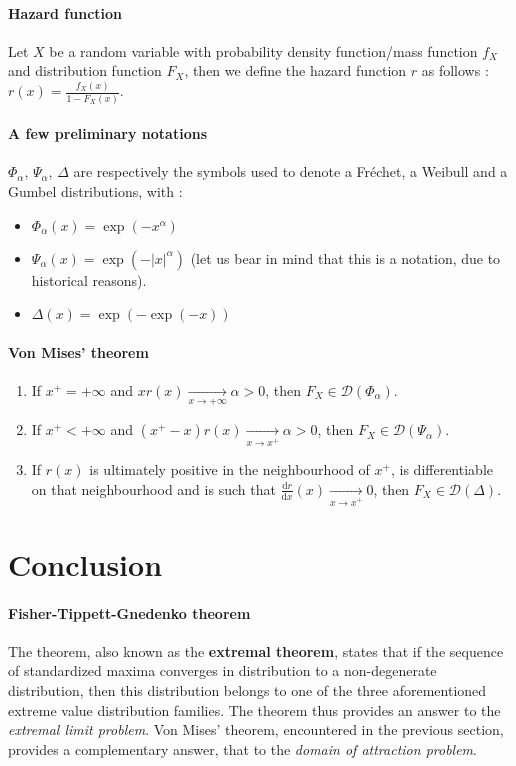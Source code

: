 \paragraph{Hazard function} Let $X$ be a random variable with probability density function/mass function $f_X$ and distribution function $F_X$, then we define the hazard function $r$ as follows : \newline
$r(x) = \frac{f_X(x)}{1 - F_X(x)}$.
\paragraph{A few preliminary notations} $\Phi_\alpha$, $\Psi_\alpha$, $\Delta$ are respectively the symbols used to denote a Fréchet, a Weibull and a Gumbel distributions, with :
\begin{itemize}
	\item $\Phi_\alpha(x) = \exp(- x^\alpha)$
	\item $\Psi_\alpha(x) = \exp(-  \lvert x \rvert^\alpha)$ (let us bear in mind that this is a notation, due to historical reasons).
	\item $\Delta(x) = \exp(- \exp(- x))$
\end{itemize}
\paragraph{Von Mises' theorem}
\begin{enumerate}
	\item If $x^+ = + \infty$ and $x r(x) \xrightarrow[x \rightarrow + \infty]{} \alpha > 0$, then $F_X \in \mathcal{D}(\Phi_\alpha)$.
	\item If $x^+ < + \infty$ and $(x^+ - x) r(x) \xrightarrow[x \rightarrow x^+]{} \alpha > 0$, then $F_X \in \mathcal{D}(\Psi_\alpha)$.
	\item If $r(x)$ is ultimately positive in the neighbourhood of $x^+$, is differentiable on that neighbourhood and is such that $\frac{\mathrm{d}r}{\mathrm{d}x}(x) \xrightarrow[x \rightarrow x^+]{} 0$, then $F_X \in \mathcal{D}(\Delta)$.
\end{enumerate}
\section{Conclusion}
\paragraph{Fisher-Tippett-Gnedenko theorem} The  theorem, also known as the \textbf{extremal theorem}, states that if the sequence of standardized maxima converges in distribution to a non-degenerate distribution, then this distribution belongs to one of the three aforementioned extreme value distribution families. The theorem thus provides an answer to the \textit{extremal limit problem}. Von Mises' theorem, encountered in the previous section, provides a complementary answer, that to the \textit{domain of attraction problem}.







